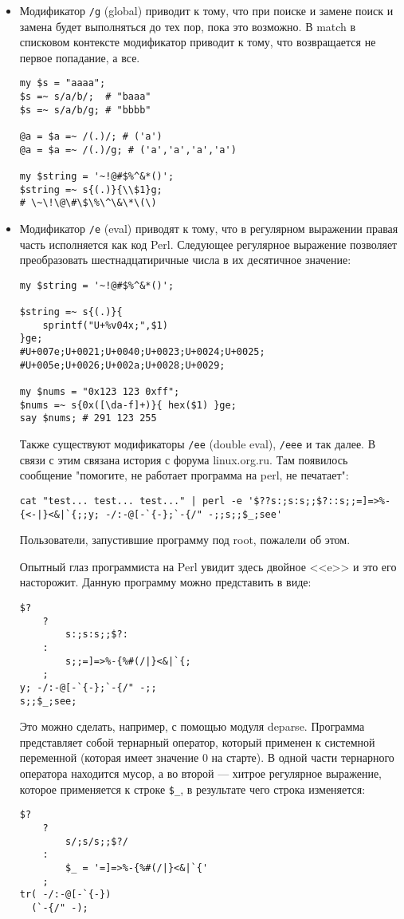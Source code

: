 \begin{itemize}
\item Модификатор \verb|/g| (global) приводит к тому, что при поиске и замене поиск и замена будет выполняться до тех пор, пока это возможно. В match в списковом контексте модификатор приводит к тому, что возвращается не первое попадание, а все.
\begin{verbatim}
my $s = "aaaa";
$s =~ s/a/b/;  # "baaa"
$s =~ s/a/b/g; # "bbbb"

@a = $a =~ /(.)/; # ('a')
@a = $a =~ /(.)/g; # ('a','a','a','a')

my $string = '~!@#$%^&*()';
$string =~ s{(.)}{\\$1}g;
# \~\!\@\#\$\%\^\&\*\(\)
\end{verbatim}

\item Модификатор \verb|/e| (eval) приводят к тому, что в регулярном выражении правая часть исполняется как код Perl. Следующее регулярное выражение позволяет преобразовать шестнадцатиричные числа в их десятичное значение:
\begin{verbatim}
my $string = '~!@#$%^&*()';

$string =~ s{(.)}{
    sprintf("U+%v04x;",$1)
}ge;
#U+007e;U+0021;U+0040;U+0023;U+0024;U+0025;
#U+005e;U+0026;U+002a;U+0028;U+0029;

my $nums = "0x123 123 0xff";
$nums =~ s{0x([\da-f]+)}{ hex($1) }ge;
say $nums; # 291 123 255
\end{verbatim}
Также существуют модификаторы \verb|/ee| (double eval), \verb|/eee| и так далее. В связи с этим связана история с форума linux.org.ru. Там появилось сообщение "помогите, не работает программа на perl, не печатает":
\begin{verbatim}
cat "test... test... test..." | perl -e '$??s:;s:s;;$?::s;;=]=>%-{<-|}<&|`{;;y; -/:-@[-`{-};`-{/" -;;s;;$_;see'
\end{verbatim}
Пользователи, запустившие программу под root, пожалели об этом.

Опытный глаз программиста на Perl увидит здесь двойное <<e>> и это его насторожит. Данную программу можно представить в виде:
\begin{verbatim}
$?
    ?
        s:;s:s;;$?:
    :
        s;;=]=>%-{%#(/|}<&|`{;
    ;
y; -/:-@[-`{-};`-{/" -;;
s;;$_;see;
\end{verbatim}
Это можно сделать, например, с помощью модуля deparse. Программа представляет собой тернарный оператор, который применен к системной переменной (которая имеет значение 0 на старте). В одной части тернарного оператора находится мусор, а во второй --- хитрое регулярное выражение, которое применяется к строке \verb|$_|, в результате чего строка изменяется:
\begin{verbatim}
$?
    ?
        s/;s/s;;$?/
    :
        $_ = '=]=>%-{%#(/|}<&|`{'
    ;
tr( -/:-@[-`{-})
  (`-{/" -);


\end{verbatim}
\end{itemize}
